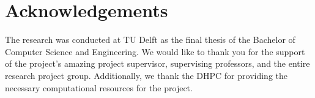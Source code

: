\section{Acknowledgements}
\label{sec:acknowledgements}

The research was conducted at TU Delft as the final thesis of the Bachelor of Computer Science and Engineering. We would like to thank you for the support of the project's amazing project supervisor, supervising professors, and the entire research project group. Additionally, we thank the DHPC \cite{DHPC2024} for providing the necessary computational resources for the project.